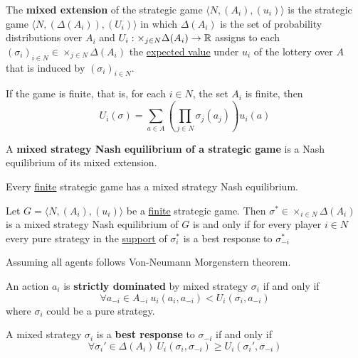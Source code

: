 \documentclass[11pt]{article}
\begin{document}
		\begin{definition}[32.1]
			The \textbf{mixed extension} of the strategic game $\langle N, (A_i), (u_i) \rangle$ is the strategic game $\langle N, (\Delta(A_i)), (U_i) \rangle$ in which $\Delta(A_i)$ is the set of probability distributions over $A_i$ and $U_i: \times_{j \in N} \Delta(A_i) \to \mathbb{R}$ assigns to each $(\sigma_i)_{i \in N} \in \times_{j \in N} \Delta(A_i)$ the \ul{expected value} under $u_i$ of the lottery over $A$ that is induced by $(\sigma_i)_{i \in N}$.
		\end{definition}
		
		\begin{remark}
			If the game is finite, that is, for each $i \in N$, the set $A_i$ is finite, then
			\[
				U_i(\sigma) = \sum_{a \in A} (\prod_{j \in N} \sigma_j(a_j)) u_i(a)
			\]
		\end{remark}
		
		\begin{definition}[32.3]
			A \textbf{mixed strategy Nash equilibrium of a strategic game} is a Nash equilibrium of its mixed extension.
		\end{definition}
		
		\begin{proposition}[33.1]
			Every \ul{finite} strategic game has a mixed strategy Nash equilibrium.
		\end{proposition}
		
		\begin{lemma}[33.2]
			Let $G = \langle N, (A_i), (u_i) \rangle$ be a \ul{finite} strategic game. Then $\sigma^* \in \times_{i \in N}\Delta(A_i)$ is a mixed strategy Nash equilibrium of $G$ is and only if for every player $i \in N$ every pure strategy in the \ul{support} of $\sigma_i^*$ is a best response to $\sigma_{-i}^*$
		\end{lemma}
		
		\begin{assumption}[lec.5]
			Assuming all agents follows Von-Neumann Morgenstern theorem. 
		\end{assumption}
		
		\begin{definition}[lec.5]
			An action $a_i$ is \textbf{strictly dominated} by mixed strategy $\sigma_i$ if and only if
			\[
				\forall a_{-i} \in A_{-i} \ u_i(a_i, a_{-i}) < U_i(\sigma_i, a_{-i})
			\]
			where $\sigma_i$ could be a pure strategy.
		\end{definition}
		
		\begin{definition}[lec.5]
			A mixed strategy $\sigma_i$ is a \textbf{best response} to $\sigma_{-i}$ if and only if
			\[
				\forall \sigma_i' \in \Delta(A_i)\ U_i(\sigma_i, \sigma_{-i}) \geq U_i(\sigma_i', \sigma_{-i})
			\]
		\end{definition}
		
\end{document}
